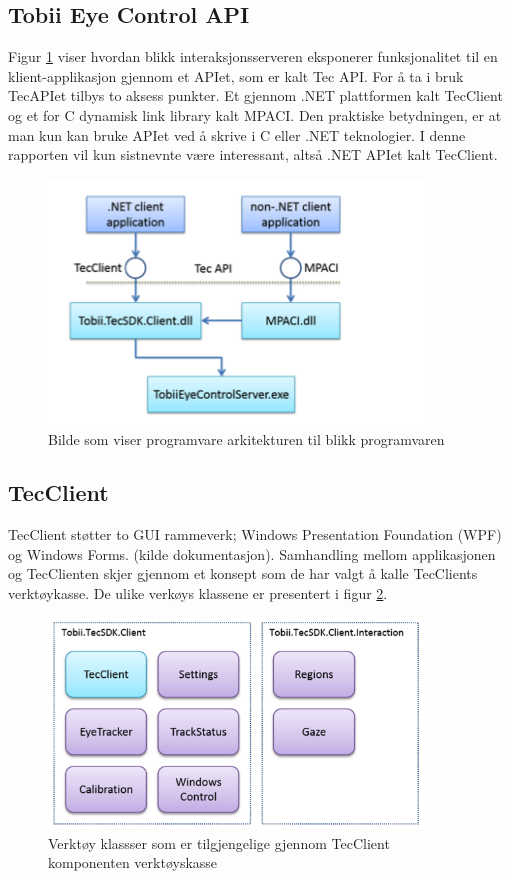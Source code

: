 \documentclass[phd,tocprelim]{cornell}
\begin{document}
\subsection{Tobii Eye Control API }

Figur \ref{fig:overview} viser hvordan blikk interaksjonsserveren eksponerer funksjonalitet til en klient-applikasjon gjennom et APIet, som er kalt Tec API. For å ta i bruk TecAPIet tilbys to aksess punkter. Et gjennom .NET plattformen kalt TecClient og et for C dynamisk link library kalt MPACI.  Den praktiske betydningen, er at man kun kan bruke APIet ved å skrive i C eller .NET teknologier. I denne rapporten vil kun sistnevnte være interessant, altså .NET APIet kalt TecClient.


\begin{figure}[ht!]
\centering
\includegraphics[width=100mm]{SoftwareArchitectureOverview}
\caption{Bilde som viser programvare arkitekturen til blikk programvaren}
\label{fig:overview}
\end{figure}


\subsection{TecClient}

TecClient støtter to GUI rammeverk; Windows Presentation Foundation (\gls{WPF}) og Windows Forms. 
 (kilde dokumentasjon).  Samhandling mellom applikasjonen og TecClienten skjer gjennom et konsept som de har valgt å kalle TecClients verktøykasse. De ulike verkøys klassene er presentert i figur \ref{fig:toolbox}. 

\begin{figure}[ht!]
\centering
\includegraphics[width=100mm]{Toolbox}
\caption{Verktøy klassser som er tilgjengelige gjennom TecClient komponenten verktøyskasse}
\label{fig:toolbox}
\end{figure}
\end{document}
